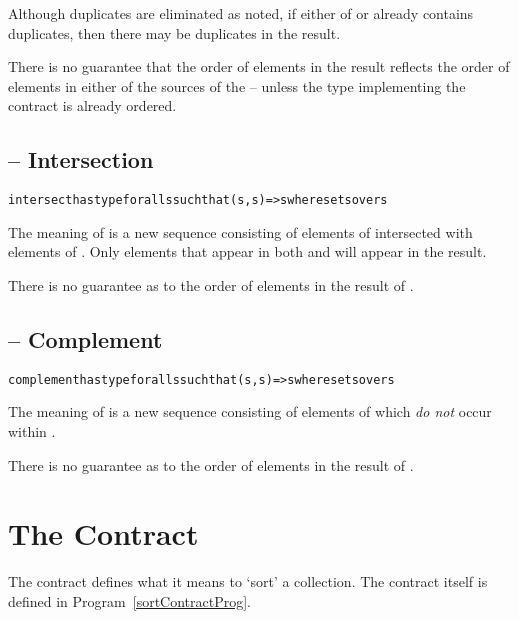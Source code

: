 \begin{aside}
Although duplicates are eliminated as noted, if either of  or  already contains duplicates, then there may be duplicates in the result.
\end{aside}

\begin{aside}
There is no guarantee that the order of elements in the result reflects the order of elements in either of the sources of the  -- unless the type implementing the  contract is already ordered.
\end{aside}

\subsection{ -- Intersection}
\label{intersectFunction}
\begin{alltt}
intersect has type for all s such that (s,s)=>s where sets over s
\end{alltt}
The meaning of  is a new sequence consisting of elements of  intersected with elements of . Only elements that appear in both  and  will appear in the result.

\begin{aside}
There is no guarantee as to the order of elements in the result of .
\end{aside}

\subsection{ -- Complement}
\label{complementFunction}
\begin{alltt}
complement has type for all s such that (s,s)=>s where sets over s
\end{alltt}
The meaning of  is a new sequence consisting of elements of  which \emph{do not} occur within .

\begin{aside}
There is no guarantee as to the order of elements in the result of .
\end{aside}


\section{The  Contract}
\label{sortingContract}
The  contract defines what it means to `sort' a collection. The contract itself is defined in Program~\vref{sortContractProg}.

